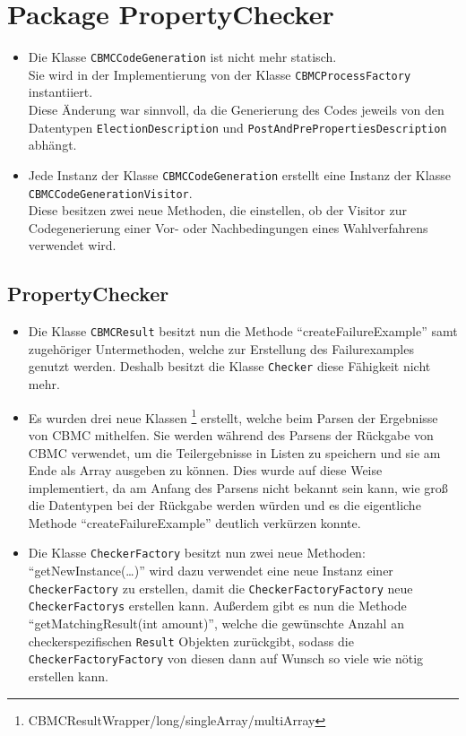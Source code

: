 \documentclass[a4paper]{scrreprt}
\begin{document}
\section{Package PropertyChecker}
\begin{itemize}
\subsection{CBMCCodeGeneration}
\item Die Klasse \verb!CBMCCodeGeneration! ist nicht mehr statisch. \\
Sie wird in der Implementierung von der Klasse \verb!CBMCProcessFactory! instantiiert. \\
Diese Änderung war sinnvoll, da die Generierung des Codes jeweils von den Datentypen \verb!ElectionDescription! und \verb!PostAndPrePropertiesDescription! abhängt.
\item Jede Instanz der Klasse \verb!CBMCCodeGeneration! erstellt eine Instanz der Klasse \\\verb!CBMCCodeGenerationVisitor!. \\
Diese besitzen zwei neue Methoden, die einstellen, ob der Visitor zur Codegenerierung einer Vor- oder Nachbedingungen eines Wahlverfahrens verwendet wird.  \\
\end{itemize}
\subsection{PropertyChecker}

\begin{itemize}
\item Die Klasse \verb!CBMCResult! besitzt nun die Methode
``createFailureExample'' samt zugehöriger Untermethoden, welche zur Erstellung des Failurexamples
  genutzt werden. Deshalb besitzt die Klasse \verb!Checker! diese Fähigkeit nicht mehr.

\item Es wurden drei neue Klassen
\footnote{CBMCResultWrapper/long/singleArray/multiArray} erstellt, welche
beim Parsen der Ergebnisse von CBMC mithelfen. Sie werden während des Parsens der Rückgabe von CBMC verwendet, um die Teilergebnisse in Listen zu speichern und sie am Ende als Array ausgeben zu können. Dies wurde auf diese Weise implementiert, da am
Anfang des Parsens nicht bekannt sein kann, wie groß die Datentypen bei der
Rückgabe werden würden und es die eigentliche Methode ``createFailureExample''
deutlich verkürzen konnte.

\item Die Klasse \verb!CheckerFactory! besitzt nun zwei neue Methoden: \newline
``getNewInstance(\ldots)'' wird dazu verwendet eine neue Instanz einer
\verb!CheckerFactory! zu erstellen, damit die \verb!CheckerFactoryFactory! neue \verb!CheckerFactorys!
erstellen kann. \newline Außerdem gibt es nun die Methode ``getMatchingResult(int
amount)'', welche die gewünschte Anzahl an checkerspezifischen \verb!Result! Objekten
zurückgibt, sodass die \verb!CheckerFactoryFactory! von diesen dann auf Wunsch so viele
wie nötig erstellen kann.
\end{itemize}
\end{document}
